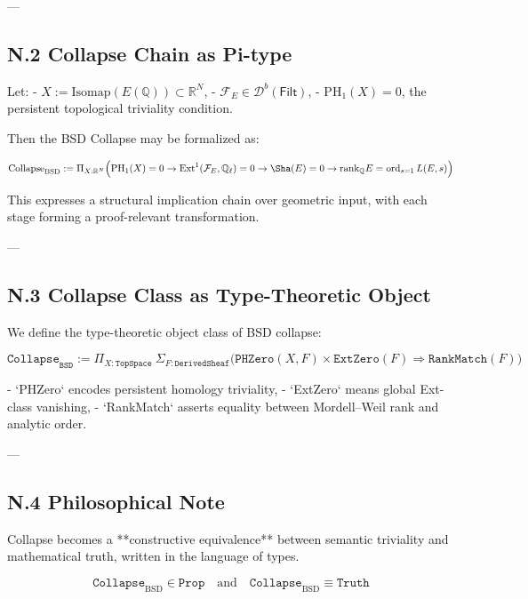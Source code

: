 ---

\subsection*{N.2 Collapse Chain as Pi-type}

Let:
- \( X := \mathrm{Isomap}(E(\mathbb{Q})) \subset \mathbb{R}^N \),
- \( \mathcal{F}_E \in \mathcal{D}^b(\mathsf{Filt}) \),
- \( \mathrm{PH}_1(X) = 0 \), the persistent topological triviality condition.

Then the BSD Collapse may be formalized as:

\[
\mathrm{Collapse}_{\mathrm{BSD}} := 
\Pi_{X : \mathbb{R}^N} \Big(
\mathrm{PH}_1(X) = 0 \to 
\mathrm{Ext}^1(\mathcal{F}_E, \mathbb{Q}_\ell) = 0 \to 
\Sha(E) = 0 \to 
\mathrm{rank}_\mathbb{Q} E = \operatorname{ord}_{s=1} L(E,s)
\Big)
\]

This expresses a structural implication chain over geometric input,  
with each stage forming a proof-relevant transformation.

---

\subsection*{N.3 Collapse Class as Type-Theoretic Object}

We define the type-theoretic object class of BSD collapse:

\[
\texttt{Collapse}_{\texttt{BSD}} := 
\Pi_{X : \texttt{TopSpace}} \ \Sigma_{F : \texttt{DerivedSheaf}} \Big(
\texttt{PHZero}(X, F) \times \texttt{ExtZero}(F) \Rightarrow \texttt{RankMatch}(F)
\Big)
\]

- `PHZero` encodes persistent homology triviality,
- `ExtZero` means global Ext-class vanishing,
- `RankMatch` asserts equality between Mordell–Weil rank and analytic order.

---

\subsection*{N.4 Philosophical Note}

Collapse becomes a **constructive equivalence** between  
semantic triviality and mathematical truth, written in the language of types.

\[
\boxed{
\texttt{Collapse}_{\mathrm{BSD}} \in \texttt{Prop}
}
\quad \text{and} \quad
\texttt{Collapse}_{\mathrm{BSD}} \equiv \texttt{Truth}
\]



